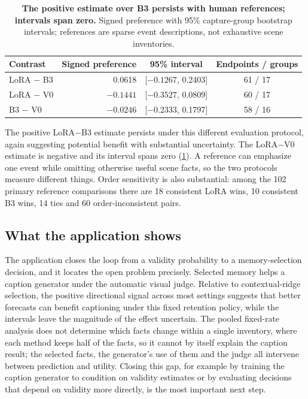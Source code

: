 \documentclass[10pt]{article}
\begin{document}
\begin{table}[t]
\centering
\caption{\textbf{The positive estimate over B3 persists with human references; intervals span zero.} Signed preference with 95\% capture-group bootstrap intervals; references are sparse event descriptions, not exhaustive scene inventories.}
\label{tab:human}
\begin{tabular}{lrcc}
\toprule
Contrast & Signed preference & 95\% interval & Endpoints / groups \\
\midrule
LoRA $-$ B3 & 0.0618 & [$-0.1267$, 0.2403] & 61 / 17 \\
LoRA $-$ V0 & $-0.1441$ & [$-0.3527$, 0.0809] & 60 / 17 \\
B3 $-$ V0 & $-0.0246$ & [$-0.2333$, 0.1797] & 58 / 16 \\
\bottomrule
\end{tabular}
\end{table}

The positive LoRA$-$B3 estimate persists under this different evaluation protocol, again suggesting potential benefit with substantial uncertainty. The LoRA$-$V0 estimate is negative and its interval spans zero (\cref{tab:human}). A reference can emphasize one event while omitting otherwise useful scene facts, so the two protocols measure different things. Order sensitivity is also substantial: among the 102 primary reference comparisons there are 18 consistent LoRA wins, 10 consistent B3 wins, 14 ties and 60 order-inconsistent pairs.

\subsection{What the application shows}
The application closes the loop from a validity probability to a memory-selection decision, and it locates the open problem precisely. Selected memory helps a caption generator under the automatic visual judge. Relative to contextual-ridge selection, the positive directional signal across most settings suggests that better forecasts can benefit captioning under this fixed retention policy, while the intervals leave the magnitude of the effect uncertain. The pooled fixed-rate analysis does not determine which facts change within a single inventory, where each method keeps half of the facts, so it cannot by itself explain the caption result; the selected facts, the generator's use of them and the judge all intervene between prediction and utility. Closing this gap, for example by training the caption generator to condition on validity estimates or by evaluating decisions that depend on validity more directly, is the most important next step.
\end{document}
